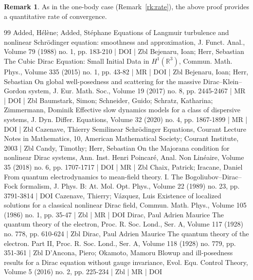 \documentclass[10pt]{amsart}
\theoremstyle{definition}\newtheorem{defi}[theo]{Definition}\newtheorem{rema}[theo]{Remark}\newtheorem{exam}[theo]{Example}\newtheorem{exem}[theo]{Example}\newtheorem{nota}[theo]{Notation}
\begin{document}
\begin{rema}\label{rk:rate-mb}
As in the one-body case (Remark~\ref{rk:rate}), the above proof provides a quantitative rate of convergence.
\end{rema}



\begin{thebibliography}{99}
Added, Hélène; Added, Stéphane Equations of Langmuir turbulence and nonlinear Schrödinger equation: smoothness and approximation, J. Funct. Anal., Volume 79 (1988) no. 1, pp. 183-210 | DOI | Zbl
Bejenaru, Ioan; Herr, Sebastian The Cubic Dirac Equation: Small Initial Data in ${H}^1(\mathbb{R}^3)$, Commun. Math. Phys., Volume 335 (2015) no. 1, pp. 43-82 | MR | DOI | Zbl
Bejenaru, Ioan; Herr, Sebastian On global well-posedness and scattering for the massive Dirac–Klein–Gordon system, J. Eur. Math. Soc., Volume 19 (2017) no. 8, pp. 2445-2467 | MR | DOI | Zbl
Baumstark, Simon; Schneider, Guido; Schratz, Katharina; Zimmermann, Dominik Effective slow dynamics models for a class of dispersive systems, J. Dyn. Differ. Equations, Volume 32 (2020) no. 4, pp. 1867-1899 | MR | DOI | Zbl
Cazenave, Thierry Semilinear Schrödinger Equations, Courant Lecture Notes in Mathematics, 10, American Mathematical Society; Courant Institute, 2003 | Zbl
Candy, Timothy; Herr, Sebastian On the Majorana condition for nonlinear Dirac systems, Ann. Inst. Henri Poincaré, Anal. Non Linéaire, Volume 35 (2018) no. 6, pp. 1707-1717 | DOI | MR | Zbl
Chaix, Patrick; Iracane, Daniel From quantum electrodynamics to mean-field theory. I. The Bogoliubov–Dirac–Fock formalism, J. Phys. B: At. Mol. Opt. Phys., Volume 22 (1989) no. 23, pp. 3791-3814 | DOI
Cazenave, Thierry; Vázquez, Luis Existence of localized solutions for a classical nonlinear Dirac field, Commun. Math. Phys., Volume 105 (1986) no. 1, pp. 35-47 | Zbl | MR | DOI
Dirac, Paul Adrien Maurice The quantum theory of the electron, Proc. R. Soc. Lond., Ser. A, Volume 117 (1928) no. 778, pp. 610-624 | Zbl
Dirac, Paul Adrien Maurice The quantum theory of the electron. Part II, Proc. R. Soc. Lond., Ser. A, Volume 118 (1928) no. 779, pp. 351-361 | Zbl
D’Ancona, Piero; Okamoto, Mamoru Blowup and ill-posedness results for a Dirac equation without gauge invariance, Evol. Equ. Control Theory, Volume 5 (2016) no. 2, pp. 225-234 | Zbl | MR | DOI

\end{thebibliography}
\end{document}
